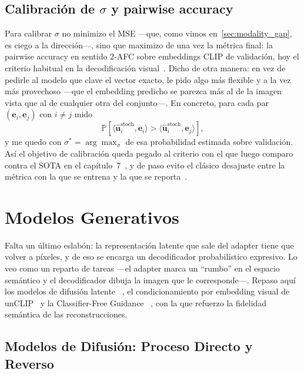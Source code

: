 \subsection{Calibración de $\sigma$ y pairwise accuracy}

Para calibrar $\sigma$ no minimizo el MSE ---que, como vimos en~\ref{sec:modality_gap}, 
es ciego a la dirección---, sino que maximizo de una vez la métrica final: la pairwise accuracy 
en sentido 2-AFC sobre embeddings CLIP de validación, hoy el criterio habitual en la 
decodificación visual~\cite{scotti2023mindeye,scotti2024mindeye2,ozcelik2023,takagi2023}. 
Dicho de otra manera: en vez de pedirle al modelo que clave el vector exacto, le pido algo más 
flexible y a la vez más provechoso ---que el embedding predicho se parezca más al de la imagen 
vista que al de cualquier otra del conjunto---. En concreto, para cada par 
$(\mathbf{e}_i,\mathbf{e}_j)$ con $i\!\neq\!j$ mido
\begin{equation}
\mathbb{P}\!\left[\langle\hat{\mathbf{u}}_i^{\text{stoch}},\mathbf{e}_i\rangle > \langle\hat{\mathbf{u}}_i^{\text{stoch}},\mathbf{e}_j\rangle\right],
\end{equation}
y me quedo con $\sigma^{*} = \arg\max_\sigma$ de esa probabilidad estimada sobre validación. 
Así el objetivo de calibración queda pegado al criterio con el que luego comparo contra el SOTA 
en el capítulo~7~\cite{scotti2023mindeye}, y de paso evito el clásico desajuste entre la 
métrica con la que se entrena y la que se reporta~\cite{hastie2009elements}.

\section{Modelos Generativos}

Falta un último eslabón: la representación latente que sale del adapter tiene que volver a 
píxeles, y de eso se encarga un decodificador probabilístico expresivo. Lo veo como un reparto 
de tareas ---el adapter marca un ``rumbo'' en el espacio semántico y el decodificador dibuja la 
imagen que le corresponde---. Repaso aquí los modelos de difusión latente
~\cite{ho2020ddpm,sohldickstein2015deep,rombach2022high}, el condicionamiento por embedding 
visual de unCLIP~\cite{ramesh2022unclip} y la Classifier-Free Guidance
~\cite{ho2022cfg,ho2022classifier}, con la que refuerzo la fidelidad semántica de las 
reconstrucciones.

\subsection{Modelos de Difusión: Proceso Directo y Reverso}

